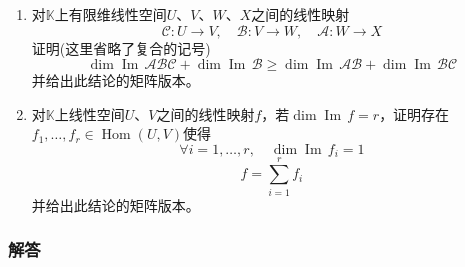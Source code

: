 \documentclass[a4paper,UTF8,fontset=windows,AutoFakeBold]{ctexart}
\DeclareMathOperator{\im}{Im\,}
\DeclareMathOperator{\Hom}{Hom}
\newcommand*{\ma}{\mathcal{A}}
\newcommand*{\mb}{\mathcal{B}}
\newcommand*{\mc}{\mathcal{C}}
\begin{document}
\begin{enumerate}
\begin{enumerate}
    \end{enumerate}
    \item 对$\mathbb{K}$上有限维线性空间$U$、$V$、$W$、$X$之间的线性映射
    $$\mc:U\to V,\quad\mb:V\to W,\quad\ma:W\to X$$
    证明(这里省略了复合的记号)
    $$\dim\im\ma\mb\mc+\dim\im\mb\ge\dim\im\ma\mb+\dim\im\mb\mc$$
    并给出此结论的矩阵版本。
    \item 对$\mathbb{K}$上线性空间$U$、$V$之间的线性映射$f$，若$\dim\im f=r$，证明存在$f_1,\dots,f_r\in\Hom(U,V)$使得
    $$\forall i=1,\dots,r,\quad\dim\im f_i=1$$
    $$f=\sum_{i=1}^rf_i$$
    并给出此结论的矩阵版本。
\end{enumerate}

\subsubsection{解答}
\end{document}
